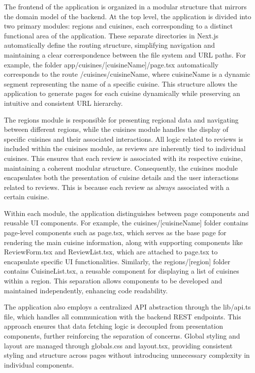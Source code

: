 The frontend of the application is organized in a modular structure that mirrors the domain model of the backend. 
At the top level, the application is divided into two primary modules: regions and cuisines, 
each corresponding to a distinct functional area of the application. These separate directories in Next.js 
automatically define the routing structure, simplifying navigation and maintaining a clear correspondence 
between the file system and URL paths. For example, the folder app/cuisines/[cuisineName]/page.tsx 
automatically corresponds to the route /cuisines/{cuisineName}, where {cuisineName} 
is a dynamic segment representing the name of a specific cuisine. This structure allows the application 
to generate pages for each cuisine dynamically while preserving an intuitive and consistent URL hierarchy.

The regions module is responsible for presenting regional data and navigating between different regions, 
while the cuisines module handles the display of specific cuisines and their associated interactions. 
All logic related to reviews is included within the cuisines module, as reviews are inherently 
tied to individual cuisines. This ensures that each review is associated with its respective cuisine, 
maintaining a coherent modular structure. Consequently, the cuisines module encapsulates both 
the presentation of cuisine details and the user interactions related to reviews. This is because each review
as always associated with a certain cuisine.

Within each module, the application distinguishes between page components and reusable UI components. 
For example, the cuisines/[cuisineName] folder contains page-level components such as page.tsx, 
which serves as the base page for rendering the main cuisine information, along with supporting components 
like ReviewForm.tsx and ReviewList.tsx, which are attached to page.tsx to encapsulate specific UI functionalities. 
Similarly, the regions/[region] folder contains CuisineList.tsx, a reusable component for displaying 
a list of cuisines within a region. This separation allows components to be developed and maintained 
independently, enhancing code readability.

The application also employs a centralized API abstraction through the lib/api.ts file, 
which handles all communication with the backend REST endpoints. This approach ensures that 
data fetching logic is decoupled from presentation components, further reinforcing the separation 
of concerns. Global styling and layout are managed through globals.css and layout.tsx, 
providing consistent styling and structure across pages without introducing unnecessary complexity in 
individual components.


